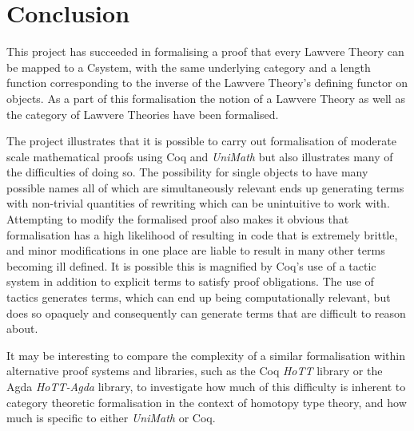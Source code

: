 \chapter{Conclusion}
This project has succeeded in formalising a proof that every Lawvere Theory can
be mapped to a Csystem, with the same underlying category and a length function
corresponding to the inverse of the Lawvere Theory's defining functor on
objects. As a part of this formalisation the notion of a Lawvere Theory as well
as the category of Lawvere Theories have been formalised.

The project illustrates that it is possible to carry out formalisation of
moderate scale mathematical proofs using Coq and \textit{UniMath} but also
illustrates many of the difficulties of doing so. The possibility for single
objects to have many possible names all of which are simultaneously relevant
ends up generating terms with non-trivial quantities of rewriting which can be
unintuitive to work with. Attempting to modify the formalised proof also makes
it obvious that formalisation has a high likelihood of resulting in code that is
extremely brittle, and minor modifications in one place are liable to result in
many other terms becoming ill defined. It is possible this is magnified by Coq's
use of a tactic system in addition to explicit terms to satisfy proof
obligations. The use of tactics generates terms, which can end up being
computationally relevant, but does so opaquely and consequently can generate
terms that are difficult to reason about.

It may be interesting to compare the complexity of a similar formalisation
within alternative proof systems and libraries, such as the Coq \textit{HoTT}
library\cite{coq-hott} or the Agda \textit{HoTT-Agda} library\cite{agda-hott},
to investigate how much of this difficulty is inherent to category theoretic
formalisation in the context of homotopy type theory, and how much is specific
to either \textit{UniMath} or Coq.